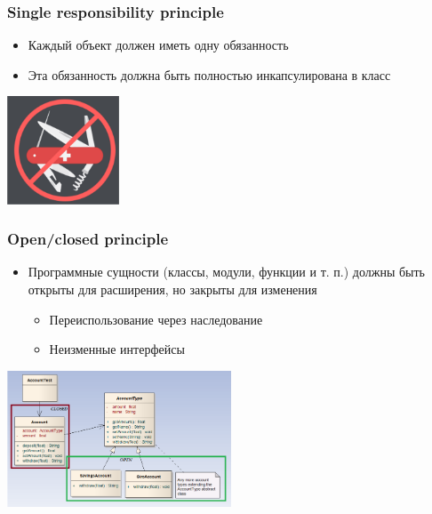 \documentclass[xetex,mathserif,serif]{beamer}
\begin{document}
	\begin{frame}
		\frametitle{Single responsibility principle}
		\begin{itemize}
			\item Каждый объект должен иметь одну обязанность
			\item Эта обязанность должна быть полностью инкапсулирована в класс
		\end{itemize}
		\begin{flushright}
			\includegraphics[width=0.25\textwidth]{singleResponsibility.png}
		\end{flushright}
	\end{frame}

	\begin{frame}
		\frametitle{Open/closed principle}
		\begin{itemize}
			\item Программные сущности (классы, модули, функции и т. п.) должны быть открыты для расширения, но закрыты для изменения
			\begin{itemize}
				\item Переиспользование через наследование
				\item Неизменные интерфейсы
			\end{itemize}
		\end{itemize}
		\begin{flushright}
			\includegraphics[width=0.5\textwidth]{openClosedPrinciple.png}
		\end{flushright}
	\end{frame}
\end{document}

